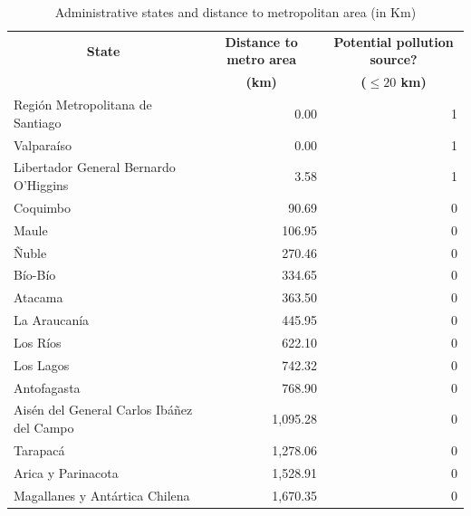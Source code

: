 \begin{table}[htbp]
  \centering
  \caption{Administrative states and distance to metropolitan area (in Km)}
  \begin{tabular}{lrr}
    \midrule
    \midrule
    \multicolumn{1}{c}{\textbf{State}} &
    \multicolumn{1}{c}{\textbf{Distance to metro area}} &
    \multicolumn{1}{c}{\textbf{Potential pollution source?}} \\
    \multicolumn{1}{c}{} &
    \multicolumn{1}{c}{\textbf{(km)}} &
    \multicolumn{1}{c}{\textbf{($\leq 20$ km)}} \\
    \midrule
    Región Metropolitana de Santiago & 0.00 & 1 \\
    Valparaíso & 0.00 & 1 \\
    Libertador General Bernardo O'Higgins & 3.58 & 1 \\
    Coquimbo & 90.69 & 0 \\
    Maule & 106.95 & 0 \\
    Ñuble & 270.46 & 0 \\
    Bío-Bío & 334.65 & 0 \\
    Atacama & 363.50 & 0 \\
    La Araucanía & 445.95 & 0 \\
    Los Ríos & 622.10 & 0 \\
    Los Lagos & 742.32 & 0 \\
    Antofagasta & 768.90 & 0 \\
    Aisén del General Carlos Ibáñez del Campo & 1,095.28 & 0 \\
    Tarapacá & 1,278.06 & 0 \\
    Arica y Parinacota & 1,528.91 & 0 \\
    Magallanes y Antártica Chilena & 1,670.35 & 0 \\
    \bottomrule
    \bottomrule
  \end{tabular}
  \label{table_state_metro_distances}
\end{table}
